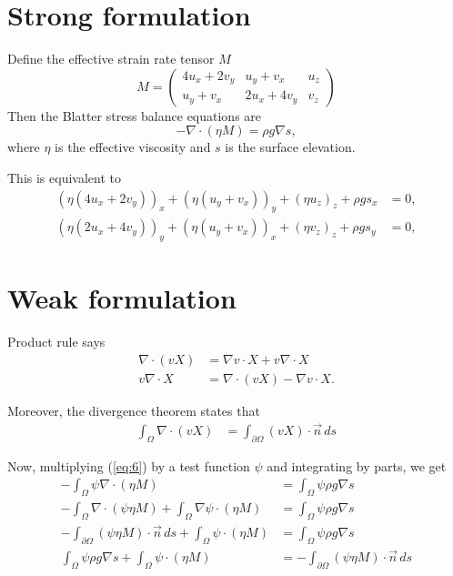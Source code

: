 \documentclass[draft]{article}
\begin{document}
\section{Strong formulation}
\label{sec:strong-formulation}
Define the effective strain rate tensor $M$
\begin{equation}
  \label{eq:5}
  M = \left(
  \begin{array}{ccc}
  4 u_x + 2 v_y & u_y + v_x & u_z\\
  u_y + v_x & 2 u_x + 4 v_y & v_z
  \end{array}
\right)
\end{equation}
Then the Blatter stress balance equations are
\begin{equation}
  \label{eq:6}
  - \nabla\cdot(\eta M) = \rho g \nabla s,
\end{equation}
where $\eta$ is the effective viscosity and $s$ is the surface elevation.

This is equivalent to
\begin{equation}
  \label{eq:7}
  \begin{aligned}
    \left(\eta (4 u_x + 2 v_y)\right)_x + \left(\eta (u_y + v_x)\right)_y + \left(\eta u_z\right)_z + \rho g s_x &= 0,\\
    \left(\eta (2 u_x + 4 v_y)\right)_y + \left(\eta (u_y + v_x)\right)_x + \left(\eta v_z\right)_z + \rho g s_y &= 0,
  \end{aligned}
\end{equation}
\section{Weak formulation}
\label{sec:weak-formulation}

Product rule says
\begin{align*}
  \nabla \cdot (v X) &= \nabla v \cdot X + v \nabla \cdot X\\
  v\nabla \cdot X &= \nabla\cdot(v X) - \nabla v \cdot X.
\end{align*}

Moreover, the divergence theorem states that
\begin{align*}
  \int_\Omega \nabla\cdot (v X) &= \int_{\partial \Omega} (v X)\cdot \vec n\, ds
\end{align*}

Now, multiplying (\ref{eq:6}) by a test function $\psi$ and integrating by parts, we get
\newcommand{\rhs}{\int_\Omega \psi \rho g \nabla s}
\begin{align}
  -\int_\Omega \psi \nabla\cdot(\eta M) &= \rhs\\
  -\int_\Omega \nabla\cdot (\psi \eta M) + \int_\Omega \nabla \psi \cdot (\eta M) &= \rhs\\
  -\int_{\partial \Omega} (\psi \eta M)\cdot \vec n\, ds + \int_\Omega \psi\cdot (\eta M) &= \rhs\\
  \rhs + \int_\Omega \psi\cdot (\eta M) &= - \int_{\partial \Omega} (\psi \eta M)\cdot \vec n\, ds
\end{align}
\end{document}
